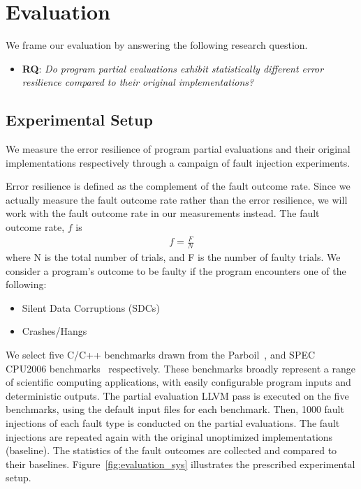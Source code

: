 \section{Evaluation}
\label{sec:evaluation}

We frame our evaluation by answering the following research question. 

\begin{itemize}
\item {\bf RQ}: \textit{Do program partial evaluations exhibit statistically different error resilience compared to their original implementations?}
\end{itemize}

\subsection{Experimental Setup}
\label{sec:exp.setup}

We measure the error resilience of program partial evaluations and their original implementations respectively through a campaign of fault injection experiments. 

Error resilience is defined as the complement of the fault outcome rate.
Since we actually measure the fault outcome rate rather than the error resilience, we will work with the fault outcome rate in our measurements instead.
The fault outcome rate, $f$ is 
\begin{align*}
f = \frac{F}{N}
\end{align*}
where N is the total number of trials, and F is the number of faulty trials.
We consider a program's outcome to be faulty if the program encounters one of the following:
\begin{itemize}
\item Silent Data Corruptions (SDCs) 
\item Crashes/Hangs
\end{itemize}

\bigbreak

We select five C/C++ benchmarks drawn from the Parboil~\cite{Parboil}, and SPEC CPU2006 benchmarks~\cite{SPEC} respectively.
These benchmarks broadly represent a range of scientific computing applications, with easily configurable program inputs and deterministic outputs.
The partial evaluation LLVM pass is executed on the five benchmarks, using the default input files for each benchmark.
Then, 1000 fault injections of each fault type is conducted on the partial evaluations.
The fault injections are repeated again with the original unoptimized implementations (baseline).
The statistics of the fault outcomes are collected and compared to their baselines. 
Figure~\ref{fig:evaluation_sys} illustrates the prescribed experimental setup.

